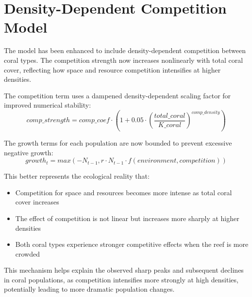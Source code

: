 \section{Density-Dependent Competition Model}

The model has been enhanced to include density-dependent competition between coral types. The competition strength now increases nonlinearly with total coral cover, reflecting how space and resource competition intensifies at higher densities.

The competition term uses a dampened density-dependent scaling factor for improved numerical stability:
\[ comp\_strength = comp\_coef \cdot (1 + 0.05 \cdot (\frac{total\_coral}{K\_coral})^{comp\_density}) \]

The growth terms for each population are now bounded to prevent excessive negative growth:
\[ growth_t = max(-N_{t-1}, r \cdot N_{t-1} \cdot f(environment, competition)) \]

This better represents the ecological reality that:
\begin{itemize}
\item Competition for space and resources becomes more intense as total coral cover increases
\item The effect of competition is not linear but increases more sharply at higher densities
\item Both coral types experience stronger competitive effects when the reef is more crowded
\end{itemize}

This mechanism helps explain the observed sharp peaks and subsequent declines in coral populations, as competition intensifies more strongly at high densities, potentially leading to more dramatic population changes.

